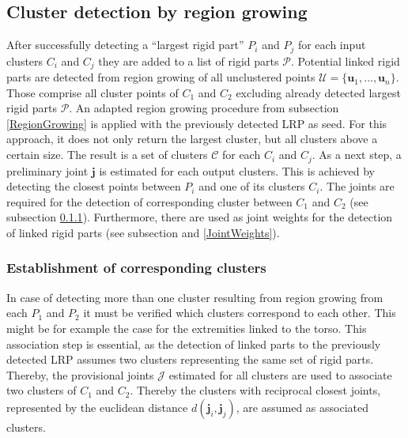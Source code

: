 \subsection{Cluster detection by region growing}
\label{cluster}
After successfully detecting a ``largest rigid part'' $P_i$ and $P_j$ for each input clusters $C_i$ and $C_j$ they are added to a list of rigid parts $\mathcal{P}$. Potential linked rigid parts are detected from region growing of all unclustered points $\mathcal{U} =  \{\boldsymbol{u}_1,\ldots,\boldsymbol{u}_n\}$. Those comprise all cluster points of $C_1$ and $C_2$ excluding already detected largest rigid parts $\mathcal{P}$. An adapted region growing procedure from subsection \ref{RegionGrowing} is applied with the previously detected LRP as seed. 
For this approach, it does not only return the largest cluster, but all clusters above a certain size. The result is a set of clusters $\mathcal{C}$ for each $C_i$ and $C_j$. As a next step, a preliminary joint $\boldsymbol{j}$ is estimated for each output clusters. This is achieved by detecting the closest points between $P_i$ and one of its clusters $C_i$. The joints are required for the detection of corresponding cluster between $C_1$ and $C_2$ (see subsection \ref{CorrespondingClusters}). Furthermore, there are used as joint weights for the detection of linked rigid parts (see subsection  and \ref{JointWeights}).

\subsubsection{Establishment of corresponding clusters}
\label{CorrespondingClusters}
In case of detecting more than one cluster resulting from region growing from each $P_1$ and $P_2$ it must be verified which clusters correspond to each other. This might be for example the case for the extremities linked to the torso. This association step is essential, as the detection of linked parts to the previously detected LRP assumes two clusters representing the same set of rigid parts. Thereby, the provisional joints $\mathcal{J}$ estimated for all clusters are used to associate two clusters of $C_1$ and $C_2$. Thereby the clusters with reciprocal closest joints, represented by the euclidean distance $d(\boldsymbol{j}_i,\boldsymbol{j}_j)$, are assumed as associated clusters.

